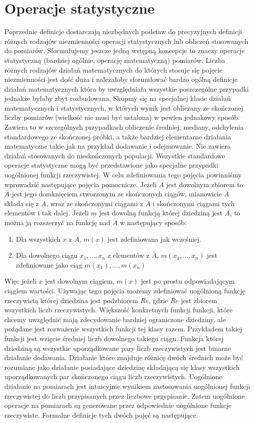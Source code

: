 \documentclass[12pt,a4paper]{report}
\begin{document}
\section{Operacje statystyczne}
Poprzednie definicje dostarczają niezbędnych podstaw do precyzyjnych definicji różnych rodzajów niezmienności operacji statystycznych lub obliczeń stosowanych do pomiarów. Sformułujemy jeszcze jedną wstępną koncepcje to znaczy operacje statystyczną  (bardziej ogólnie, operację matematyczną) pomiarów. Liczba różnych rodzajów działań matematycznych  do których stosuje się pojęcie niezmienności jest dość duża i należałoby sformułować bardzo ogólną definicje działań matematycznych która by uwzględniała wszystkie poszczególne przypadki jednakże byłaby zbyt rozbudowana. Skupmy się na specjalnej klasie działań matematycznych i statystycznych, w których wynik jest obliczany ze skończonej liczby pomiarów (wielkość nie musi być ustalona) w pewien jednakowy sposób. Zawiera to w szczególnych przypadkach obliczenie średniej, mediany, odchylenia standardowego ze skończonej próbki, a także bardziej elementarne działania matematyczne takie jak na przykład dodawanie i odejmowanie. Nie zawiera działań stosowanych do nieskończonych populacji. Wszystkie standardowe operacje statystyczne mogą być przedstawione jako specjalne przypadki uogólnionej funkcji rzeczywistej. W celu zdefiniowania tego pojęcia powinniśmy wprowadzić następujące pojęcia pomocnicze. Jeżeli $A$ jest dowolnym zbiorem to $\overline{A}$ jest jego domknięciem stworzonym ze skończonych ciągów, mianowicie $\overline{A}$ składa się z $A$, wraz ze skończonymi ciągami z $A$ i skończonymi ciągami tych elementów i tak dalej. Jeżeli $m$ jest dowolną funkcją której dziedziną jest $A$, to można ją rozszerzyć na funkcję nad $\overline{A}$ w następujący sposób:
\begin{enumerate}
\item
Dla wszystkich $x$ z $A$, $m(x)$ jest zdefiniowana jak wcześniej.
\item
Dla dowolnego ciągu $x_{1},\dots,x_{n}$ z elementów z $\overline{A}$, $m( x_{1},\dots,x_{n})$ jest zdefiniowane jako ciąg $m(x_{1}),\dots,m(x_{n})$
\end{enumerate} 
Więc jeżeli $x$ jest dowolnym ciągiem, $m(x)$ jest po prostu odpowiadającym ciągiem wartości. Używając tego pojęcia możemy zdefiniować uogólnioną funkcję rzeczywistą której dziedzina jest podzbiorem $\overline{Re}$, gdzie $\overline{Re}$ jest zbiorem wszystkich liczb rzeczywistych. Większość konkretnych funkcji funkcji, które chcemy uwzględnić mają zdecydowanie bardziej ograniczone dziedziny, ale pożądane jest rozważenie wszystkich funkcji tej klasy razem. Przykładem takiej funkcji jest wzięcie średniej  liczb dowolnego takiego ciągu. Funkcja której dziedziną są wszystkie uporządkowane pary liczb rzeczywistych jest binarne działanie dodawania. Działanie które znajduje różnicę dwóch średnich może być rozumiane jako działanie posiadające dziedzinę składającą się klasy wszystkich uporządkowanych par skończonego ciągu liczb rzeczywistych. Uogólnione działanie na pomiarach jest intuicyjnie wynikiem zastosowania uogólnionej funkcji rzeczywistej  do liczb przypisanych przez liczbowe przypisanie. Zatem uogólnione operacje na pomiarach są generowane przez odpowiednie uogólnione funkcje rzeczywiste. Formalne definicje tych dwóch pojęć są następujące.
\end{document}
